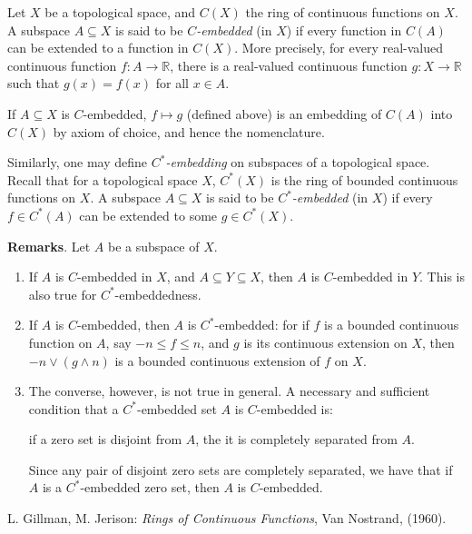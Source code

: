 \documentclass[12pt]{article}
\begin{document}
Let $X$ be a topological space, and $C(X)$ the ring of continuous functions on $X$.  A subspace $A\subseteq X$ is said to be \emph{$C$-embedded} (in $X$) if every function in $C(A)$ can be extended to a function in $C(X)$.  More precisely, for every real-valued continuous function $f:A\to \mathbb{R}$, there is a real-valued continuous function $g:X\to \mathbb{R}$ such that $g(x)=f(x)$ for all $x\in A$.

If $A\subseteq X$ is $C$-embedded, $f\mapsto g$ (defined above) is an embedding of $C(A)$ into $C(X)$ by axiom of choice, and hence the nomenclature.

Similarly, one may define \emph{$C^*$-embedding} on subspaces of a topological space.  Recall that for a topological space $X$, $C^*(X)$ is the ring of bounded continuous functions on $X$.  A subspace $A\subseteq X$ is said to be \emph{$C^*$-embedded} (in $X$) if every $f\in C^*(A)$ can be extended to some $g\in C^*(X)$.

\textbf{Remarks}.  Let $A$ be a subspace of $X$.
\begin{enumerate}
\item 
If $A$ is $C$-embedded in $X$, and $A\subseteq Y\subseteq X$, then $A$ is $C$-embedded in $Y$.  This is also true for $C^*$-embeddedness.
\item
If $A$ is $C$-embedded, then $A$ is $C^*$-embedded: for if $f$ is a bounded continuous function on $A$, say $-n\le f\le n$, and $g$ is its continuous extension on $X$, then $-n\vee (g\wedge n)$ is a bounded continuous extension of $f$ on $X$.
\item
The converse, however, is not true in general.  A necessary and sufficient condition that a $C^*$-embedded set $A$ is $C$-embedded is: 
\begin{center}
if a zero set is disjoint from $A$, the it is completely separated from $A$.  
\end{center}
Since any pair of disjoint zero sets are completely separated, we have that if $A$ is a $C^*$-embedded zero set, then $A$ is $C$-embedded.
\end{enumerate}

\begin{thebibliography}{7}
 L. Gillman, M. Jerison: {\em Rings of Continuous Functions}, Van Nostrand, (1960).
\end{thebibliography}
\end{document}
